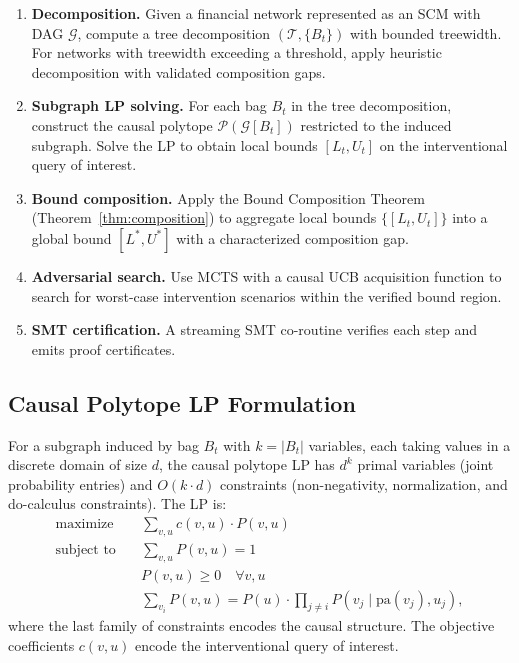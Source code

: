 \documentclass[11pt,a4paper]{article}
\newcommand{\calG}{\mathcal{G}}
\newcommand{\calP}{\mathcal{P}}
\newcommand{\calT}{\mathcal{T}}
\newcommand{\pa}{\mathrm{pa}}
\begin{document}
\begin{enumerate}[nosep]
\item \textbf{Decomposition.} Given a financial network represented as an SCM with DAG $\calG$, compute a tree decomposition $(\calT, \{B_t\})$ with bounded treewidth. For networks with treewidth exceeding a threshold, apply heuristic decomposition with validated composition gaps.

\item \textbf{Subgraph LP solving.} For each bag $B_t$ in the tree decomposition, construct the causal polytope $\calP(\calG[B_t])$ restricted to the induced subgraph. Solve the LP to obtain local bounds $[L_t, U_t]$ on the interventional query of interest.

\item \textbf{Bound composition.} Apply the Bound Composition Theorem (Theorem~\ref{thm:composition}) to aggregate local bounds $\{[L_t, U_t]\}$ into a global bound $[L^*, U^*]$ with a characterized composition gap.

\item \textbf{Adversarial search.} Use MCTS with a causal UCB acquisition function to search for worst-case intervention scenarios within the verified bound region.

\item \textbf{SMT certification.} A streaming SMT co-routine verifies each step and emits proof certificates.
\end{enumerate}

\subsection{Causal Polytope LP Formulation}
\label{sec:polytope}

For a subgraph induced by bag $B_t$ with $k = |B_t|$ variables, each taking values in a discrete domain of size $d$, the causal polytope LP has $d^k$ primal variables (joint probability entries) and $O(k \cdot d)$ constraints (non-negativity, normalization, and do-calculus constraints). The LP is:
\begin{align}
\text{maximize} \quad & \sum_{v,u} c(v,u) \cdot P(v,u) \\
\text{subject to} \quad & \sum_{v,u} P(v,u) = 1 \\
& P(v,u) \geq 0 \quad \forall v,u \\
& \sum_{v_i} P(v,u) = P(u) \cdot \prod_{j \neq i} P(v_j \mid \pa(v_j), u_j),
\end{align}
where the last family of constraints encodes the causal structure. The objective coefficients $c(v,u)$ encode the interventional query of interest.
\end{document}
